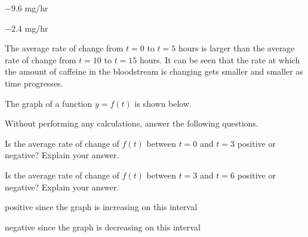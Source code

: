 \begin{solution}
    \begin{parts}
        \item $-9.6$ mg/hr
        \item $-2.4$ mg/hr
        \item The average rate of change from $t = 0$ to $t = 5$ hours is larger than the average rate of change from $t=10$ to $t=15$ hours. It can be seen that the rate at which the amount of caffeine in the bloodstream is changing gets smaller and smaller as time progresses.
    \end{parts}
\end{solution}





\begin{exercise}
The graph of a function $y=f(t)$ is shown below.

\begin{center}
\end{center}

\noindent Without performing any calculations, answer the following questions.

    \begin{parts}
        \item Is the average rate of change of $f(t)$ between  $t=0$ and $t=3$ positive or negative? Explain your answer.

        \item Is the average rate of change of $f(t)$ between  $t=3$ and $t=6$ positive or negative? Explain your answer.

    \end{parts}
\end{exercise}



\begin{solution}
    \begin{parts}
        \item positive since the graph is increasing on this interval
        \item negative since the graph is decreasing on this interval
    \end{parts}
\end{solution}





